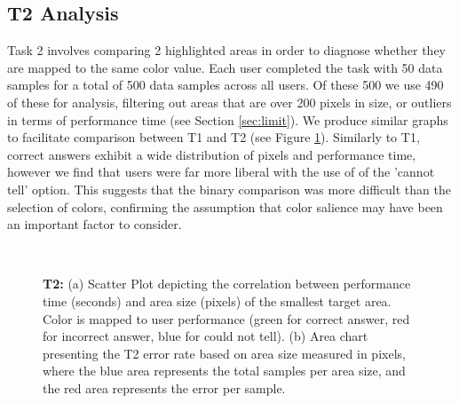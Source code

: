 \subsection{T2 Analysis}
Task 2 involves comparing 2 highlighted areas in order to diagnose whether they are mapped to the same color value. Each user completed the task with 50 data samples for a total of 500 data samples across all users. Of these 500 we use 490 of these for analysis, filtering out areas that are over 200 pixels in size, or outliers in terms of performance time (see Section \ref{sec:limit}).  We produce similar graphs to facilitate comparison between T1 and T2 (see Figure \ref{fig:t2results}). Similarly to T1, correct answers exhibit a wide distribution of pixels and performance time, however we find that users were far more liberal with the use of of the 'cannot tell' option. This suggests that the binary comparison was more difficult than the selection of colors, confirming the assumption that color salience may have been an important factor to consider.

\begin{figure}[p]
\centering
{} \\ \vspace{-0.35cm}
\caption{\textbf{T2:} (a) Scatter Plot depicting the correlation between performance time (seconds) and area size (pixels) of the smallest target area. Color is mapped to user performance (green for correct answer, red for incorrect answer, blue for could not tell). (b) Area chart presenting the T2 error rate based on area size measured in pixels, where the blue area represents the total samples per area size, and the red area represents the error per sample.} \label{fig:t2results} \vspace{-0.6cm}
\end{figure}

